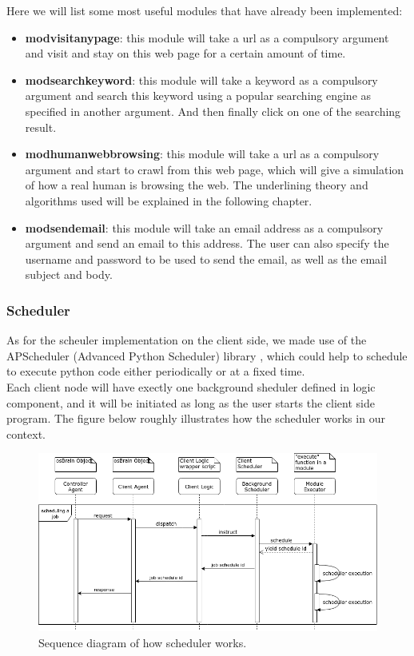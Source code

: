 \documentclass[12pt]{report}
\begin{document}
Here we will list some most useful modules that have already been implemented:
\begin{itemize}
\item \textbf{mod\textunderscore visit\textunderscore any\textunderscore page}: this module will take a url as a compulsory argument and visit and stay on this web page for a certain amount of time.
\item \textbf{mod\textunderscore search\textunderscore key\textunderscore word}: this module will take a keyword as a compulsory argument and search this keyword using a popular searching engine as specified in another argument. And then finally click on one of the searching result.
\item \textbf{mod\textunderscore human\textunderscore web\textunderscore browsing}: this module will take a url as a compulsory argument and start to crawl from this web page, which will give a simulation of how a real human is browsing the web. The underlining theory and algorithms used will be explained in the following chapter.
\item \textbf{mod\textunderscore send\textunderscore email}: this module will take an email address as a compulsory argument and send an email to this address. The user can also specify the username and password to be used to send the email, as well as the email subject and body.
\end{itemize}


\subsubsection{Scheduler}
As for the scheuler implementation on the client side, we made use of the APScheduler (Advanced Python Scheduler) library \citep{APScheduler}, which could help to schedule to execute python code either periodically or at a fixed time.\\

Each client node will have exectly one background sheduler defined in logic component, and it will be initiated as long as the user starts the client side program. The figure below roughly illustrates how the scheduler works in our context.\\

\begin{figure}[h!]
	\centering
	\includegraphics[width=1\textwidth]{./pictures/scheduler-uml}
	\caption{Sequence diagram of how scheduler works.}
\end{figure}
\end{document}
